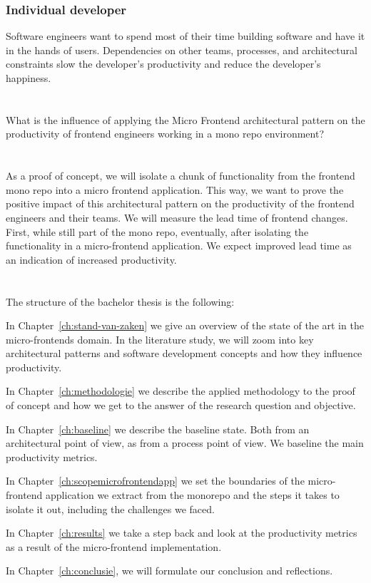 \subsubsection{Individual developer}
Software engineers want to spend most of their time building software and have it in the hands of users. Dependencies on other teams, processes, and architectural constraints slow the developer's productivity and reduce the developer's happiness.
\section{}
\label{sec:onderzoeksvraag}
What is the influence of applying the Micro Frontend architectural pattern on the productivity of frontend engineers working in a mono repo environment?

\section{}
\label{sec:onderzoeksdoelstelling}
As a proof of concept, we will isolate a chunk of functionality from the frontend mono repo into a micro frontend application. This way, we want to prove the positive impact of this architectural pattern on the productivity of the frontend engineers and their teams.
We will measure the lead time of frontend changes. First, while still part of the mono repo, eventually, after isolating the functionality in a micro-frontend application. We expect improved lead time as an indication of increased productivity. 

\section{}
\label{sec:opzet-bachelorproef}
The structure of the bachelor thesis is the following:

In Chapter~\ref{ch:stand-van-zaken} we give an overview of the state of the art in the micro-frontends domain. In the literature study, we will zoom into key architectural patterns and software development concepts and how they influence productivity.

In Chapter~\ref{ch:methodologie} we describe the applied methodology to the proof of concept and how we get to the answer of the research question and objective.

In Chapter~\ref{ch:baseline} we describe the baseline state. Both from an architectural point of view, as from a process point of view. We baseline the main productivity metrics.

In Chapter~\ref{ch:scopemicrofrontendapp} we set the boundaries of the micro-frontend application we extract from the monorepo and the steps it takes to isolate it out, including the challenges we faced.

In Chapter~\ref{ch:results} we take a step back and look at the productivity metrics as a result of the micro-frontend implementation.

In Chapter~\ref{ch:conclusie}, we will formulate our conclusion and reflections.